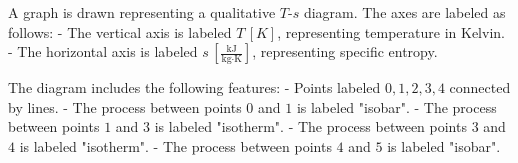 A graph is drawn representing a qualitative \( T \)-\( s \) diagram. The axes are labeled as follows:  
- The vertical axis is labeled \( T \, [K] \), representing temperature in Kelvin.  
- The horizontal axis is labeled \( s \, [\frac{\text{kJ}}{\text{kg·K}}] \), representing specific entropy.  

The diagram includes the following features:  
- Points labeled \( 0, 1, 2, 3, 4 \) connected by lines.  
- The process between points \( 0 \) and \( 1 \) is labeled "isobar".  
- The process between points \( 1 \) and \( 3 \) is labeled "isotherm".  
- The process between points \( 3 \) and \( 4 \) is labeled "isotherm".  
- The process between points \( 4 \) and \( 5 \) is labeled "isobar".